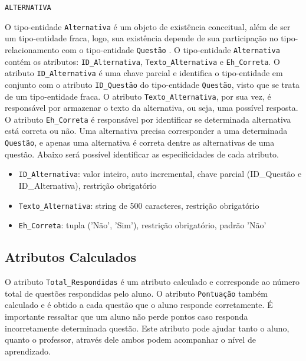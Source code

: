 \documentclass[12pt,a4paper]{article}
\begin{document}
\vspace{0.5cm}
\begin{center}
    \texttt{ALTERNATIVA}
\end{center}

O tipo-entidade \texttt{Alternativa} é um objeto de existência conceitual, além de ser um tipo-entidade fraca, logo, sua existência depende de sua participação no tipo-relacionamento com o tipo-entidade \texttt{Questão} . O tipo-entidade \texttt{Alternativa} contém os atributos: \texttt{ID\_Alternativa}, \texttt{Texto\_Alternativa} e \texttt{Eh\_Correta}. O atributo \texttt{ID\_Alternativa} é uma chave parcial e identifica o tipo-entidade em conjunto com o atributo \texttt{ID\_Questão} do tipo-entidade \texttt{Questão}, visto que se trata de um tipo-entidade fraca. O atributo \texttt{Texto\_Alternativa}, por sua vez, é responsável por armazenar o texto da alternativa, ou seja, uma possível resposta.\\

O atributo \texttt{Eh\_Correta} é responsável por identificar se determinada alternativa está correta ou não. Uma alternativa precisa corresponder a uma determinada \texttt{Questão}, e apenas uma alternativa é correta dentre as alternativas de uma questão. Abaixo será possível identificar as especificidades de cada atributo. \\

\begin{itemize}
    \item \texttt{ID\_Alternativa}: valor inteiro, auto incremental, chave parcial (ID\_Questão e ID\_Alternativa), restrição obrigatório
    \item \texttt{Texto\_Alternativa}: string de 500 caracteres, restrição obrigatório
    \item \texttt{Eh\_Correta}: tupla ('Não', 'Sim'), restrição obrigatório, padrão 'Não'
\end{itemize}

\subsection{Atributos Calculados}

O atributo {\texttt{Total\_Respondidas}} é um atributo calculado e corresponde ao número total de questões respondidas pelo aluno. O atributo {\texttt{Pontuação}} também calculado e é obtido a cada questão que o aluno responde corretamente. É importante ressaltar que um aluno não perde pontos caso responda incorretamente determinada questão. Este atributo pode ajudar tanto o aluno, quanto o professor, através dele ambos podem acompanhar o nível de aprendizado.\\
\end{document}
